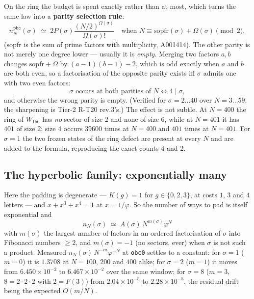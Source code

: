\documentclass[11pt]{article}
\newcommand{\rt}[1]{\texttt{#1}}
\theoremstyle{plain}
\theoremstyle{remark}
\begin{document}
On the ring the budget is spent exactly rather than at most, which turns the
same law into a \textbf{parity selection rule}:
\begin{equation}
n^{\rt{pbc}}_N(\sigma) \;\simeq\;
2P(\sigma)\frac{(N/2)^{\Omega(\sigma)}}{\Omega(\sigma)!}
\quad\text{when } N \equiv \mathrm{sopfr}(\sigma)+\Omega(\sigma) \pmod 2,
\end{equation}
($\mathrm{sopfr}$ is the sum of prime factors with multiplicity, A001414).
The other parity is not merely one degree lower --- usually it is \emph{empty}.
Merging two factors $a,b$ changes $\mathrm{sopfr}+\Omega$ by $(a-1)(b-1)-2$,
which is odd exactly when $a$ and $b$ are both even, so a factorisation of the
opposite parity exists iff $\sigma$ admits one with two even factors:
\begin{equation}
\sigma \text{ occurs at both parities of } N \iff 4 \mid \sigma ,
\end{equation}
and otherwise the wrong parity is empty. (Verified for $\sigma=2\ldots40$ over
$N=3\ldots59$; the sharpening is Tier-2 R-T20 rev.3's.) The effect is not
subtle. At
$N=400$ the ring of $W_{156}$ has \emph{no} sector of size $2$ and none of size
$6$, while at $N=401$ it has $401$ of size $2$; size $4$ occurs $39600$ times at
$N=400$ and $401$ times at $N=401$. For $\sigma=1$ the two frozen states of the
ring defect are present at every $N$ and are added to the formula, reproducing
the exact counts $4$ and $2$.

\subsection{The hyperbolic family: exponentially many}

Here the padding is degenerate --- $K(g)=1$ for $g\in\{0,2,3\}$, at costs $1$, $3$
and $4$ letters --- and $x+x^3+x^4=1$ at $x=1/\varphi$. So the number of ways to
pad is itself exponential and
\begin{equation}
\boxed{\; n_N(\sigma)\;\simeq\;A(\sigma)\,N^{m(\sigma)}\varphi^{N} \;}
\end{equation}
with $m(\sigma)$ the largest number of factors in an ordered factorisation of
$\sigma$ into Fibonacci numbers $\ge2$, and $m(\sigma)=-1$ (no sectors, ever)
when $\sigma$ is not such a product. Measured $n_N(\sigma)\,N^{-m}\varphi^{-N}$
at \rt{obc0} settles to a constant: for $\sigma=1$ ($m=0$) it is $1.3708$ at
$N=100$, $200$ and $400$ alike; for $\sigma=2$ ($m=1$) it moves from
$6.450\times10^{-2}$ to $6.467\times10^{-2}$ over the same window; for $\sigma=8$
($m=3$, $8=2\cdot2\cdot2$ with $2=F(3)$) from $2.04\times10^{-5}$ to
$2.28\times10^{-5}$, the residual drift being the expected $O(m/N)$.
\end{document}
